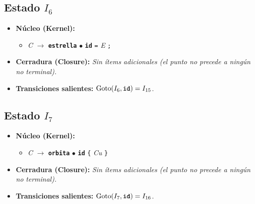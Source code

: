 \documentclass[12pt, letterpaper]{article}
\begin{document}
\subsection*{Estado $I_{6}$ }
\begin{itemize}\setlength{\itemsep}{1pt}\setlength{\parskip}{0pt}
\item \textbf{Núcleo (Kernel):}
\begin{itemize}\setlength{\itemsep}{1pt}\setlength{\parskip}{0pt}
    \item \textit{C} $\to$ \textbf{\texttt{estrella}} $\bullet$ \textbf{\texttt{id}} \texttt{=} \textit{E} \texttt{;}
\end{itemize}
\item \textbf{Cerradura (Closure):} \emph{Sin ítems adicionales (el punto no precede a ningún no terminal).}
\item \textbf{Transiciones salientes:} $\text{Goto}(I_{6}, \textbf{\texttt{id}}) = I_{15}$.
\end{itemize}
\vspace{2pt}
\subsection*{Estado $I_{7}$ }
\begin{itemize}\setlength{\itemsep}{1pt}\setlength{\parskip}{0pt}
\item \textbf{Núcleo (Kernel):}
\begin{itemize}\setlength{\itemsep}{1pt}\setlength{\parskip}{0pt}
    \item \textit{C} $\to$ \textbf{\texttt{orbita}} $\bullet$ \textbf{\texttt{id}} \texttt{\{} \textit{Cu} \texttt{\}}
\end{itemize}
\item \textbf{Cerradura (Closure):} \emph{Sin ítems adicionales (el punto no precede a ningún no terminal).}
\item \textbf{Transiciones salientes:} $\text{Goto}(I_{7}, \textbf{\texttt{id}}) = I_{16}$.
\end{itemize}
\vspace{2pt}
\end{document}
